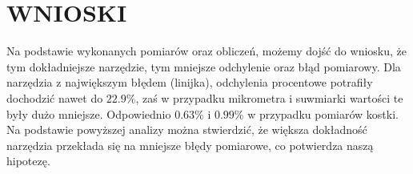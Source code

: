 \documentclass{article}
\begin{document}
\section*{WNIOSKI}

{Na podstawie wykonanych pomiarów oraz obliczeń, możemy dojść do wniosku, że tym dokładniejsze narzędzie, tym mniejsze odchylenie oraz błąd pomiarowy. Dla narzędzia z największym błędem (linijka), odchylenia procentowe potrafiły dochodzić nawet do $22.9\%$, zaś w przypadku mikrometra i suwmiarki wartości te były dużo mniejsze. Odpowiednio $0.63\%$ i $0.99\%$ w przypadku pomiarów kostki. \\
Na podstawie powyższej analizy można stwierdzić, że większa dokładność narzędzia przekłada się na mniejsze błędy pomiarowe, co potwierdza naszą hipotezę.} \\
\end{document}
